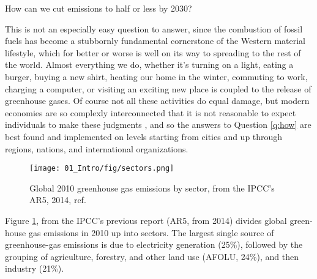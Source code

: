 \begin{question}
How can we cut emissions to half or less by 2030? \label{q:how}
\end{question}

This is not an especially easy question to answer, since the combustion of fossil fuels has become a stubbornly fundamental cornerstone of the Western material lifestyle, which for better or worse is well on its way to spreading to the rest of the world. Almost everything we do, whether it's turning on a light, eating a burger, buying a new shirt, heating our home in the winter, commuting to work, charging a computer, or visiting an exciting new place is coupled to the release of greenhouse gases. Of course not all these activities do equal damage, but modern economies are so complexly interconnected that it is not reasonable to expect individuals to make these judgments
, and so
the answers to Question \ref{q:how} are best found and implemented on levels starting from cities and up through regions, nations, and international organizations.

\begin{figure}[h!]
	\centering
	\texttt{[image: 01\_Intro/fig/sectors.png]}
	\caption{Global 2010 greenhouse gas emissions by sector, from the IPCC's AR5, 2014, ref. \cite{IPCC2014}}
	\label{fig:sectors}
\end{figure}

Figure \ref{fig:sectors}, from the IPCC's previous report (AR5, from 2014)\cite{IPCC2014} divides global green-house gas emissions in 2010 up into sectors. The largest single source of greenhouse-gas emissions is due to electricity generation (25\%), followed by the grouping of agriculture, forestry, and other land use (AFOLU, 24\%), and then industry (21\%). 

